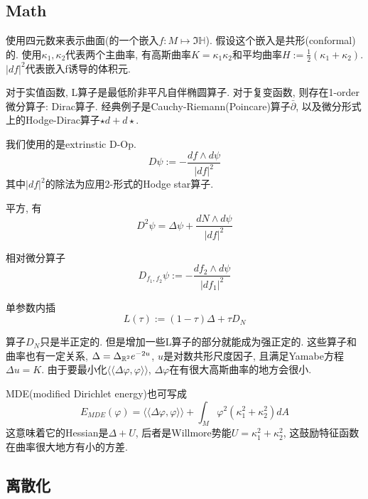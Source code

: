 \documentclass{article}
\begin{document}
\subsection{Math}

使用四元数来表示曲面(的一个嵌入$f: M\mapsto \Im \mathbb H$). 假设这个嵌入是共形(conformal)的. 使用$\kappa_1, \kappa_2$代表两个主曲率, 有高斯曲率$K=\kappa_1\kappa_2$和平均曲率$H:=\frac{1}{2}\left(\kappa_{1}+\kappa_{2}\right)$. $|df|^2$代表嵌入f诱导的体积元.

对于实值函数, L算子是最低阶非平凡自伴椭圆算子. 对于复变函数, 则存在1-order微分算子: Dirac算子. 经典例子是Cauchy-Riemann(Poincare)算子$\bar \partial$, 以及微分形式上的Hodge-Dirac算子$\star d+d \star$.

我们使用的是extrinstic D-Op.
\begin{equation}
    D\psi := -\frac{df\wedge d\psi}{|df|^2}
\end{equation}
其中$|df|^2$的除法为应用2-形式的Hodge star算子.

平方, 有
\begin{equation}
    D^{2} \psi=\Delta \psi+\frac{d N \wedge d \psi}{|d f|^{2}}
\end{equation}

相对微分算子
\begin{equation}
    D_{f_{1}, f_{2}} \psi:=-\frac{d f_{2} \wedge d \psi}{\left|d f_{1}\right|^{2}}
\end{equation}

单参数内插
\begin{equation}
    L(\tau):=(1-\tau) \Delta+\tau D_{N}
\end{equation}

算子$D_N$只是半正定的. 但是增加一些L算子的部分就能成为强正定的. 这些算子和曲率也有一定关系, $\Delta=\Delta_{\mathbb{R}^2}e^{-2u}$, $u$是对数共形尺度因子, 且满足Yamabe方程$\Delta u=K$. 由于要最小化$\langle\langle\Delta \varphi, \varphi\rangle\rangle$, $\Delta \varphi$在有很大高斯曲率的地方会很小.

MDE(modified Dirichlet energy)也可写成
\begin{equation}
    E_{M D E}(\varphi)=\langle\langle\Delta \varphi, \varphi\rangle\rangle+\int_{M} \varphi^{2}\left(\kappa_{1}^{2}+\kappa_{2}^{2}\right) d A
\end{equation}
这意味着它的Hessian是$\Delta + U$, 后者是Willmore势能$U=\kappa_1^2+\kappa_2^2$, 这鼓励特征函数在曲率很大地方有小的方差.

\subsection{离散化}
\end{document}
